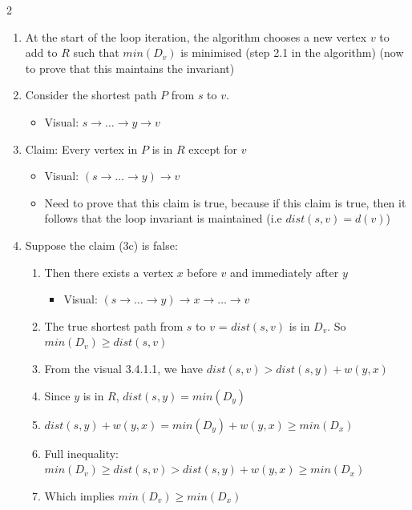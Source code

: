 \documentclass[10pt,landscape]{article}
\begin{document}
\begin{multicols*}{2}
\begin{enumerate}
        \begin{enumerate}
            \item At the start of the loop iteration, the algorithm chooses a new vertex $v$ to add to $R$ such that $min(D_v)$ is minimised (step 2.1 in the algorithm) (now to prove that this maintains the invariant)
            \item Consider the shortest path $P$ from $s$ to $v$. 
                \begin{itemize}
                    \item Visual: $s \rightarrow \dots \rightarrow y \rightarrow v$
                \end{itemize}
            \item Claim: Every vertex in $P$ is in $R$ except for $v$ 
                \begin{itemize}
                    \item Visual: $(s \rightarrow \dots \rightarrow y) \rightarrow v$
                    \item Need to prove that this claim is true, because if this claim is true, then it follows that the loop invariant is maintained (i.e $dist(s,v) = d(v)$)
                \end{itemize}
            \item Suppose the claim (3c) is false:
                \begin{enumerate}
                    \item Then there exists a vertex $x$ before $v$ and immediately after $y$
                        \begin{itemize}
                            \item Visual: $(s \rightarrow \dots \rightarrow y) \rightarrow x \rightarrow \dots \rightarrow v$
                        \end{itemize}
                    \item The true shortest path from $s$ to $v$ = $dist(s, v)$ is in $D_v$. So $min(D_v) \geq dist(s,v)$
                    \item From the visual 3.4.1.1, we have $dist(s, v) > dist(s, y) + w(y, x)$
                    \item Since $y$ is in $R$, $dist(s,y) = min(D_y)$ 
                    \item $dist(s, y) + w(y, x) = min(D_y) + w(y, x) \geq min(D_x)$
                    \item Full inequality: $min(D_v) \geq dist(s,v) > dist(s,y) + w(y,x) \geq min(D_x)$ 
                    \item Which implies $min(D_v) \geq min(D_x)$

\end{enumerate}
\end{enumerate}
\end{enumerate}
\end{multicols*}
\end{document}
